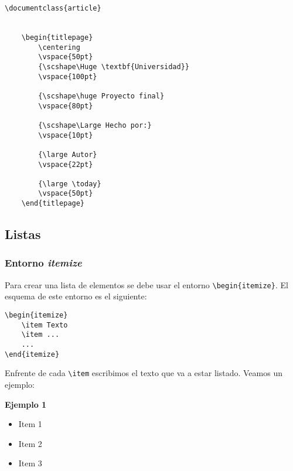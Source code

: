	\begin{myquote}
		\begin{lstlisting}
\documentclass{article}


	\begin{titlepage}
		\centering
		\vspace{50pt}
		{\scshape\Huge \textbf{Universidad}}
		\vspace{100pt}
		
		{\scshape\huge Proyecto final}
		\vspace{80pt}
		
		{\scshape\Large Hecho por:}
		\vspace{10pt} 
		
		{\large Autor}
		\vspace{22pt}
		
		{\large \today}
		\vspace{50pt}
	\end{titlepage}

		\end{lstlisting}
	\end{myquote}
	
	
	\subsection{Listas}
	
	\subsubsection{Entorno \textsl{itemize}}
	
	Para crear una lista de elementos se debe usar el entorno \verb|\begin{itemize}|. El esquema de este entorno es el siguiente:
	
	\begin{myquote}
		\begin{lstlisting}
\begin{itemize}
	\item Texto
	\item ...
	...
\end{itemize}
		\end{lstlisting}
	\end{myquote}
	
	
	Enfrente de cada \verb|\item| escribimos el texto que va a estar listado. Veamos un ejemplo:
	
	\textbf{Ejemplo 1}
	
	\begin{itemize}
		\item Item 1
		\item Item 2
		\item Item 3
	\end{itemize}
	
